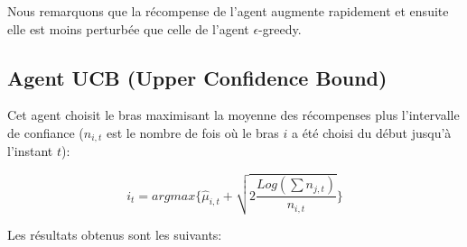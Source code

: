 \documentclass[a4paper,english,12pt]{article}
\begin{document}
\vspace{-1.5em}
Nous remarquons que la récompense de l'agent augmente rapidement et ensuite elle est moins perturbée que celle de l'agent $\epsilon$-greedy.

\vspace{-1em}
\subsection{Agent UCB (Upper Confidence Bound)}

\vspace{-0.5em}
Cet agent choisit le bras maximisant la moyenne des récompenses plus l'intervalle de confiance ($n_{i,t}$ est le nombre de fois où le bras $i$ a été choisi du début jusqu'à l'instant $t$):

\vspace{-1.5em}
$$
i_t=argmax\{\hat{\mu}_{i,t}+\sqrt{2 \frac{Log(\sum n_{j,t})}{n_{i,t}}}\}
$$

\vspace{-1em}
Les résultats obtenus sont les suivants:
\end{document}
